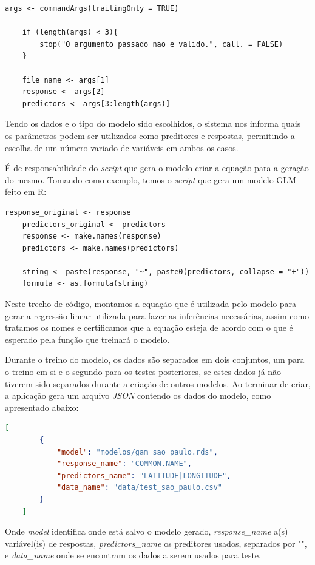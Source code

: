 \documentclass[
    12pt,               %
    openright,          %
    oneside,            %
    a4paper,            %
    english,            %
    brazil              %
    ]{abntex2}
\begin{document}
\begin{lstlisting}[style=r_code]
    args <- commandArgs(trailingOnly = TRUE)

    if (length(args) < 3){
        stop("O argumento passado nao e valido.", call. = FALSE)
    }

    file_name <- args[1]
    response <- args[2]
    predictors <- args[3:length(args)]
\end{lstlisting}

Tendo os dados e o tipo do modelo sido escolhidos, o sistema nos informa quais os parâmetros podem ser utilizados como preditores e 
respostas, permitindo a escolha de um número variado de variáveis em ambos os casos.

É de responsabilidade do \textit{script} que gera o modelo criar a equação para a geração do mesmo. Tomando como exemplo, temos o
\textit{script} que gera um modelo GLM feito em R:

\begin{lstlisting}[style=r_code]
    response_original <- response
    predictors_original <- predictors
    response <- make.names(response)
    predictors <- make.names(predictors)

    string <- paste(response, "~", paste0(predictors, collapse = "+"))
    formula <- as.formula(string)
\end{lstlisting}

Neste trecho de código, montamos a equação que é utilizada pelo modelo para gerar a regressão linear utilizada para fazer
as inferências necessárias, assim como tratamos os nomes e certificamos que a equação esteja de acordo com o que é
esperado pela função que treinará o modelo.

Durante o treino do modelo, os dados são separados em dois conjuntos, um para o treino em si e o segundo para os testes posteriores, se estes
dados já não tiverem sido separados durante a criação de outros modelos. Ao terminar de criar, a aplicação gera um arquivo \textit{JSON} 
contendo os dados do modelo, como apresentado abaixo:

\begin{lstlisting}[language=json]
    [
        {
            "model": "modelos/gam_sao_paulo.rds",
            "response_name": "COMMON.NAME",
            "predictors_name": "LATITUDE|LONGITUDE",
            "data_name": "data/test_sao_paulo.csv"
        }
    ]
\end{lstlisting}

Onde \textit{model} identifica onde está salvo o modelo gerado, \textit{response\_name} a(s) variável(is) de respostas, 
\textit{predictors\_name} os preditores usados, separados por "\textbar", e \textit{data\_name} onde se encontram os dados a serem usados 
para teste.
\end{document}
